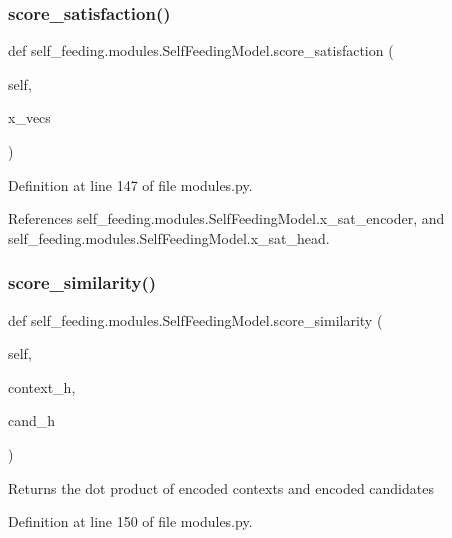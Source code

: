 \subsubsection{\texorpdfstring{score\+\_\+satisfaction()}{score\_satisfaction()}}
{\footnotesize\ttfamily def self\+\_\+feeding.\+modules.\+Self\+Feeding\+Model.\+score\+\_\+satisfaction (\begin{DoxyParamCaption}\item[{}]{self,  }\item[{}]{x\+\_\+vecs }\end{DoxyParamCaption})}



Definition at line 147 of file modules.\+py.



References self\+\_\+feeding.\+modules.\+Self\+Feeding\+Model.\+x\+\_\+sat\+\_\+encoder, and self\+\_\+feeding.\+modules.\+Self\+Feeding\+Model.\+x\+\_\+sat\+\_\+head.

\mbox{\label{classself__feeding_1_1modules_1_1SelfFeedingModel_ac08bbd26538c62f743664bf537ff438d}} 
\subsubsection{\texorpdfstring{score\+\_\+similarity()}{score\_similarity()}}
{\footnotesize\ttfamily def self\+\_\+feeding.\+modules.\+Self\+Feeding\+Model.\+score\+\_\+similarity (\begin{DoxyParamCaption}\item[{}]{self,  }\item[{}]{context\+\_\+h,  }\item[{}]{cand\+\_\+h }\end{DoxyParamCaption})}

\begin{DoxyVerb}Returns the dot product of encoded contexts and encoded candidates\end{DoxyVerb}
 

Definition at line 150 of file modules.\+py.



